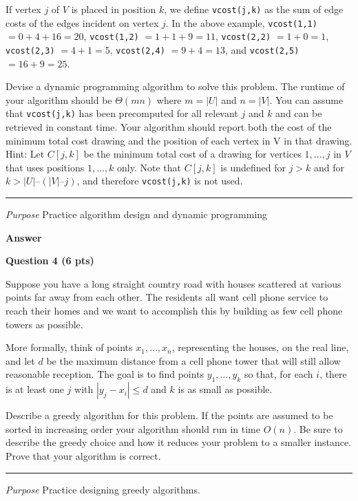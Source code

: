 \documentclass{article}
\newcommand\separator{\rule{\textwidth}{.2pt}}
\begin{document}
\begin{framed}
    If vertex $j$ of $V$ is placed in position $k$, we define 
    \texttt{vcost(j,k)} as the sum of edge costs of the edges incident on vertex
    $j$. In the above example, \texttt{vcost(1,1)} $= 0+4+16 = 20$, 
    \texttt{vcost(1,2)} $= 1+1+9 = 11$, \texttt{vcost(2,2)} $ =  1 + 0 = 1$, 
    \texttt{vcost(2,3)} $= 4 + 1 = 5$, \texttt{vcost(2,4)} $= 9 + 4 = 13$, and 
    \texttt{vcost(2,5)} $= 16 + 9 = 25$.

    Devise a dynamic programming algorithm to solve this problem. The runtime of
    your algorithm should be $\Theta(mn)$ where $m = |U|$ and $n = |V|$. You can
    assume that \texttt{vcost(j,k)} has  been precomputed for all relevant $j$ 
    and $k$ and can be retrieved in constant time. Your algorithm should report 
    both the cost of the minimum total cost drawing and the position of each 
    vertex in V in that drawing. Hint: Let $C[j,k]$ be the minimum total cost of
    a drawing for vertices $1, \ldots , j$ in $V$ that uses positions $1, \ldots
    , k$ only. Note that $C[j,k]$ is undefined for $j > k$ and for $k > |U| – 
    (|V| – j)$, and therefore \texttt{vcost(j,k)} is not used.

    \separator

    \textit{Purpose} Practice algorithm design and dynamic programming

\end{framed}


\textbf{Answer}



\newpage



\begin{framed}
    \textbf{Question 4 (6 pts)}
    
    Suppose you have a long straight country road with houses scattered at 
    various points far away from each other. The residents all want cell phone 
    service to reach their homes and we want to accomplish this by building as 
    few cell phone towers as possible.

    More formally, think of points $x_1, \ldots, x_n$, representing the houses, 
    on the real line, and let $d$ be the maximum distance from a cell phone 
    tower that will still allow reasonable reception. The goal is to find points
    $y_1,\ldots,y_k$ so that, for each $i$, there is at least one $j$ with 
    $|y_j - x_i | \le d$ and $k$ is as small as possible.

    Describe a greedy algorithm for this problem. If the points are assumed to 
    be sorted in increasing order your algorithm should run in time $O(n)$. Be 
    sure to describe the greedy choice and how it reduces your problem to a 
    smaller instance. Prove that your algorithm is correct.

    \separator

    \textit{Purpose} 
    Practice designing greedy algorithms.
\end{framed}
\end{document}
